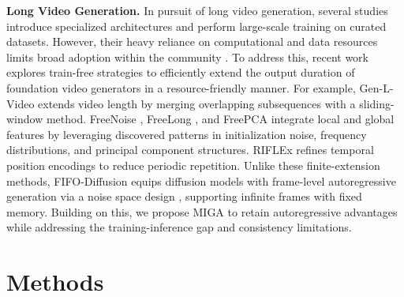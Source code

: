 \documentclass{article}
\theoremstyle{plain}
\theoremstyle{definition}
\theoremstyle{remark}
\begin{document}
\textbf{Long Video Generation.}
In pursuit of long video generation, several studies \cite{yan2025long,guo2025long,teng2025magi,chen2025skyreels,xiao2025captain,deng2024autoregressive,huang2025self} introduce specialized architectures and perform large-scale training on curated datasets.
However, their heavy reliance on computational and data resources limits broad adoption within the community \cite{lu2024freelong}.
To address this, recent work explores train-free strategies to efficiently extend the output duration of foundation video generators in a resource-friendly manner.
For example, Gen-L-Video \cite{wang2023gen} extends video length by merging overlapping subsequences with a sliding-window method. FreeNoise \cite{qiu2023freenoise}, FreeLong \cite{lu2024freelong}, and FreePCA \cite{tan2025freepca} integrate local and global features by leveraging discovered patterns in initialization noise, frequency distributions, and principal component structures. 
RIFLEx \cite{zhao2025riflex} refines temporal position encodings to reduce periodic repetition. 
Unlike these finite-extension methods, FIFO-Diffusion \cite{kim2024fifo} equips diffusion models with frame-level autoregressive generation via a noise space design \cite{chen2024diffusion,liu2025pusa}, supporting infinite frames with fixed memory. Building on this, we propose MIGA to retain autoregressive advantages while addressing the training-inference gap and consistency limitations.




\section{Methods}
\label{sec_method}
\end{document}

